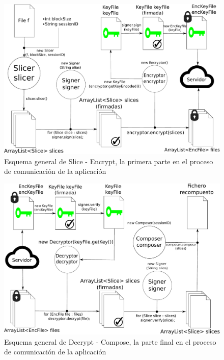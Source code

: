 \begin{figure}[!htb]
  \centering
  \includegraphics[scale=0.5]{Figures/abstractA}
  \decoRule
  \caption[Slice - Encrypt]{Esquema general de Slice - Encrypt, la primera parte en el proceso de comunicación de la aplicación}
  \label{fig:abstractA}
\end{figure}

\begin{figure}[!htb]
  \centering
  \includegraphics[scale=0.5]{Figures/abstractB}
  \decoRule
  \caption[Decrypt - Compose]{Esquema general de Decrypt - Compose, la parte final en el proceso de comunicación de la aplicación}
  \label{fig:abstractB}
\end{figure}
